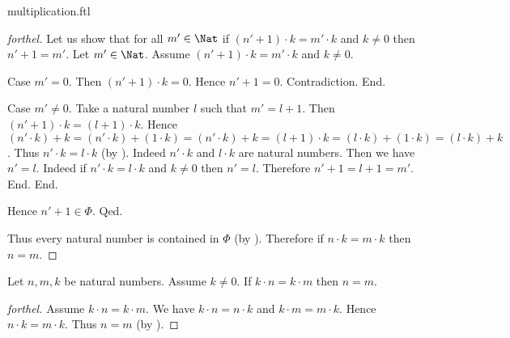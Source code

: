 \documentclass{naproche-library}
\begin{document}
\begin{smodule}{multiplication.ftl}
\begin{proof}[forthel]
      Let us show that for all $m' \in \Nat$ if $(n' + 1) \cdot k = m' \cdot k$ and $k \neq 0$ then $n' + 1 = m'$.
        Let $m' \in \Nat$.
        Assume $(n' + 1) \cdot k = m' \cdot k$ and $k \neq 0$.

        Case $m' = 0$.
          Then $(n' + 1) \cdot k = 0$.
          Hence $n' + 1 = 0$.
          Contradiction.
        End.

        Case $m' \neq 0$.
          Take a natural number $l$ such that $m' = l + 1$.
          Then $(n' + 1) \cdot k = (l + 1) \cdot k$.
          Hence $(n' \cdot k) + k
            = (n' \cdot k) + (1 \cdot k)
            = (n' \cdot k) + k
            = (l + 1) \cdot k
            = (l \cdot k) + (1 \cdot k)
            = (l \cdot k) + k$.
          Thus $n' \cdot k = l \cdot k$ (by ).
          Indeed $n' \cdot k$ and $l \cdot k$ are natural numbers.
          Then we have $n' = l$.
          Indeed if $n' \cdot k = l \cdot k$ and $k \neq 0$ then $n' = l$.
          Therefore $n' + 1 = l + 1 = m'$.
        End.
      End.

      Hence $n' + 1 \in \Phi$.
    Qed.

    Thus every natural number is contained in $\Phi$ (by ).
    Therefore if $n \cdot k = m \cdot k$ then $n = m$.
  \end{proof}

  \begin{corollary}[forthel,id=ARITHMETIC_06_8575191374364672,printid]
    Let $n, m, k$ be natural numbers.
    Assume $k \neq 0$.
    If $k \cdot n = k \cdot m$ then $n = m$.
  \end{corollary}
  \begin{proof}[forthel]
    Assume $k \cdot n = k \cdot m$.
    We have $k \cdot n = n \cdot k$ and $k \cdot m = m \cdot k$.
    Hence $n \cdot k = m \cdot k$.
    Thus $n = m$ (by ).
  \end{proof}
\end{smodule}
\end{document}

